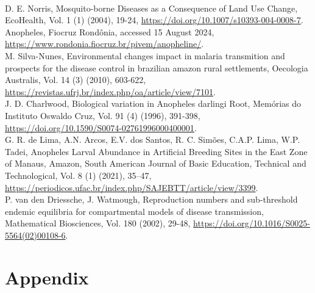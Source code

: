 \documentclass[a4paper,fleqn]{cas-dc}
\begin{document}
\begin{thebibliography}{00}
\\
 D. E. Norris, Mosquito-borne Diseases as a Consequence of Land Use Change, EcoHealth, Vol. 1 (1) (2004), 19-24, \href{https://doi.org/10.1007/s10393-004-0008-7}{https://doi.org/10.1007/s10393-004-0008-7}.
\\
 Anopheles, Fiocruz Rondônia, accessed 15 August 2024, \href{https://www.rondonia.fiocruz.br/pivem/anopheline/}{https://www.rondonia.fiocruz.br/pivem/anopheline/}.
\\
 M. Silva-Nunes, Environmental changes impact in malaria transmition and prospects for the disease control in brazilian amazon rural settlements, Oecologia Australis, Vol. 14 (3) (2010), 603-622, \href{https://revistas.ufrj.br/index.php/oa/article/view/7101}{https://revistas.ufrj.br/index.php/oa/article/view/7101}.
\\
 J. D. Charlwood, Biological variation in Anopheles darlingi Root, Memórias do Instituto Oswaldo Cruz, Vol. 91 (4) (1996), 391-398, \href{ https://doi.org/10.1590/S0074-02761996000400001}{ https://doi.org/10.1590/S0074-02761996000400001}.
\\
 G. R. de Lima, A.N. Arcos, E.V. dos Santos, R. C. Simões, C.A.P. Lima, W.P. Tadei, Anopheles Larval Abundance in Artificial Breeding Sites in the 
East Zone of Manaus, Amazon, South American Journal of Basic Education, Technical and Technological, Vol. 8 (1) (2021), 35–47, \href{https://periodicos.ufac.br/index.php/SAJEBTT/article/view/3399}{ https://periodicos.ufac.br/index.php/SAJEBTT/article/view/3399}.
\\
 P. van den Driessche, J. Watmough, Reproduction numbers and sub-threshold endemic equilibria for compartmental models of disease transmission, Mathematical Biosciences, Vol. 180 (2002), 29-48, \href{https://doi.org/10.1016/S0025-5564(02)00108-6}{ https://doi.org/10.1016/S0025-5564(02)00108-6}.
\\


\end{thebibliography}

\clearpage

\appendix
\renewcommand{\thetable}{A.\arabic{table}}
\setcounter{table}{0}  %

\section{Appendix}
\end{document}
